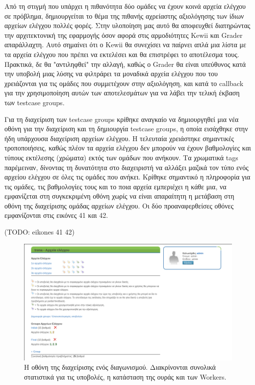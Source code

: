 \documentclass[diploma]{softlab-thesis}
\begin{document}
\bigskip

Από τη στιγμή που υπάρχει η πιθανότητα δύο ομάδες να έχουν κοινά αρχεία ελέγχου
σε πρόβλημα, δημιουργείται το θέμα της πιθανής αχρείαστης αξιολόγησης των ίδιων
αρχείων ελέγχου πολλές φορές. Στην υλοποίηση μας αυτό θα αποφευχθεί διατηρώντας
την αρχιτεκτονική της εφαρμογής όσον αφορά στις αρμοδιότητες Kewii και Grader
απαράλλαχτη. Αυτό σημαίνει ότι ο Kewii θα συνεχίσει να παίρνει απλά μια λίστα
με τα αρχεία ελέγχου που πρέπει να εκτελέσει και θα επιστρέφει το αποτέλεσμα
τους. Πρακτικά, δε θα "αντιληφθεί" την αλλαγή, καθώς ο Grader θα είναι
υπεύθυνος κατά την υποβολή μιας λύσης να φιλτράρει τα μοναδικά αρχεία ελέγχου
που του χρειάζονται για τις ομάδες που συμμετέχουν στην αξιολόγηση, και κατά το
callback για την χρησιμοποίηση αυτών των αποτελεσμάτων για να λάβει την τελική
έκβαση των testcase groups.

\bigskip

Για τη διαχείριση των testcase groups κρίθηκε αναγκαίο να δημιουργηθεί μια νέα
οθόνη για την διαχείριση και τη δημιουργία testcase groups, η οποία εισάχθηκε
στην ήδη υπάρχουσα διαχείριση αρχείων ελέγχου. Η τελευταία χρειάστηκε
σημαντικές τροποποιήσεις, καθώς πλέον τα αρχεία ελέγχου δεν μπορούν να έχουν
βαθμολογίες και τύπους εκτέλεσης (χρώματα) εκτός των ομάδων που ανήκουν. Τα
χρωματικά tags παρέμειναν, δίνοντας τη δυνατότητα στο διαχειριστή να αλλάξει
μαζικά τον τύπο ενός αρχείου ελέγχου σε όλες τις ομάδες που ανήκει. Κρίθηκε
σημαντικό η πληροφορία για τις ομάδες, τις βαθμολογίες τους και το ποια αρχεία
εμπεριέχει η κάθε μια, να εμφανίζεται στη συγκεκριμένη οθόνη χωρίς να είναι
απαραίτητη η μετάβαση στη οθόνη της διαχείρισης ομάδας αρχείων ελέγχου. Οι δύο
προαναφερθείσες οθόνες εμφανίζονται στις εικόνες 41 και 42.

\bigskip

(TODO: eikones 41 42)

\begin{figure}
  \centering
  \includegraphics[scale=0.3]{Figures/groupoverview.png}
  \caption[Οθόνη διαχείρισης προβλήματος]{Η οθόνη της διαχείρισης ενός διαγωνισμού.
  Διακρίνονται συνολικά στατιστικά για τις υποβολές, η κατάσταση της ουράς και των
  Workers.}
\end{figure}
\end{document}
